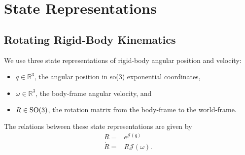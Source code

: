\section{State Representations}

\subsection{Rotating Rigid-Body Kinematics}
\label{chModels.sec.SO3}

\noindent We use three state representations of rigid-body angular
position and velocity:
\begin{itemize}
\item $q\in\mathbb{R}^3$, the angular position in so(3)
exponential coordinates,
\item $\omega\in\mathbb{R}^3$, the body-frame angular velocity, and
\item $R\in\SO3$, the rotation matrix from the body-frame to the
  world-frame.
\end{itemize}
%
The relations between these state representations are given by
%
\begin{align}
R=&e^{\mathcal{J}(q)}  \\
\dot{R}=&R\mathcal{J}(\omega).
\end{align}





